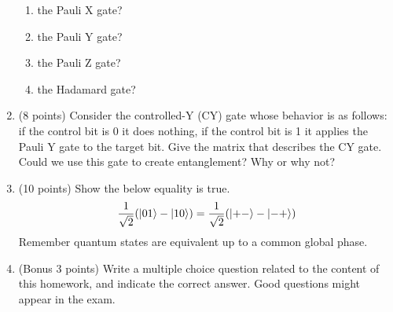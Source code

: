\documentclass[12pt]{article}
\begin{document}
\begin{enumerate}[font=\bfseries]
        \begin{enumerate}
            \item the Pauli X gate?
            \item the Pauli Y gate?
            \item the Pauli Z gate?
            \item the Hadamard gate?
        \end{enumerate}
    \item (8 points) Consider the controlled-Y (CY) gate whose behavior is as follows: if the control bit is 0 it does nothing, if the control bit is 1 it applies the Pauli Y gate to the target bit. Give the matrix that describes the CY gate. Could we use this gate to create entanglement? Why or why not?
    \item (10 points) Show the below equality is true.
    \[\frac{1}{\sqrt{2}}(\ket{01} - \ket{10}) = \frac{1}{\sqrt{2}}(\ket{+-} - \ket{-+})\]
    Remember quantum states are equivalent up to a common global phase.
    \item (Bonus 3 points) Write a multiple choice question related to the content of this homework, and indicate the correct answer. Good questions might appear in the exam.
\end{enumerate}
\end{document}
